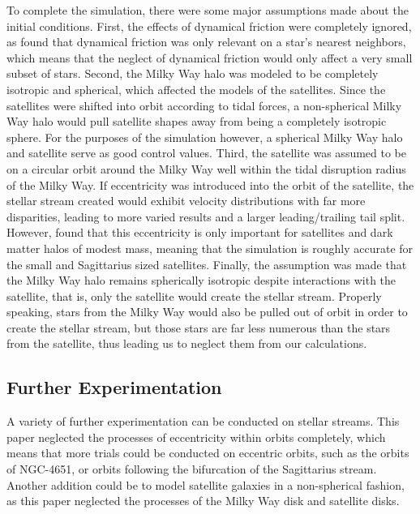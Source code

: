 \documentclass[twocolumn]{article}
\begin{document}
To complete the simulation, there were some major assumptions made about the initial conditions. First, the effects of dynamical friction were completely ignored, as \cite{dynamicalFriction} found that dynamical friction was only relevant on a star's nearest neighbors, which means that the neglect of dynamical friction would only affect a very small subset of stars. Second, the Milky Way halo was modeled to be completely isotropic and spherical, which affected the models of the satellites. Since the satellites were shifted into orbit according to tidal forces, a non-spherical Milky Way halo would pull satellite shapes away from being a completely isotropic sphere. For the purposes of the simulation however, a spherical Milky Way halo and satellite serve as good control values. Third, the satellite was assumed to be on a circular orbit around the Milky Way well within the tidal disruption radius of the Milky Way. If eccentricity was introduced into the orbit of the satellite, the stellar stream created would exhibit velocity distributions with far more disparities, leading to more varied results and a larger leading/trailing tail split. However, \cite{dynamicalFriction} found that this eccentricity is only important for satellites and dark matter halos of modest mass, meaning that the simulation is roughly accurate for the small and Sagittarius sized satellites. Finally, the assumption was made that the Milky Way halo remains spherically isotropic despite interactions with the satellite, that is, only the satellite would create the stellar stream. Properly speaking, stars from the Milky Way would also be pulled out of orbit in order to create the stellar stream, but those stars are far less numerous than the stars from the satellite, thus leading us to neglect them from our calculations. 

\subsection{Further Experimentation}

A variety of further experimentation can be conducted on stellar streams. This paper neglected the processes of eccentricity within orbits completely, which means that more trials could be conducted on eccentric orbits, such as the orbits of NGC-4651, or orbits following the bifurcation of the Sagittarius stream. Another addition could be to model satellite galaxies in a non-spherical fashion, as this paper neglected the processes of the Milky Way disk and satellite disks. 



 
\end{document}
